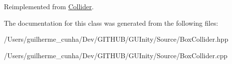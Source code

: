 Reimplemented from \hyperlink{class_collider_aed04ad82be15bcba1d3dc6a09f76dae6}{Collider}.



The documentation for this class was generated from the following files\+:\begin{DoxyCompactItemize}
\item 
/\+Users/guilherme\+\_\+cunha/\+Dev/\+G\+I\+T\+H\+U\+B/\+G\+U\+Inity/\+Source/Box\+Collider.\+hpp\item 
/\+Users/guilherme\+\_\+cunha/\+Dev/\+G\+I\+T\+H\+U\+B/\+G\+U\+Inity/\+Source/Box\+Collider.\+cpp\end{DoxyCompactItemize}
